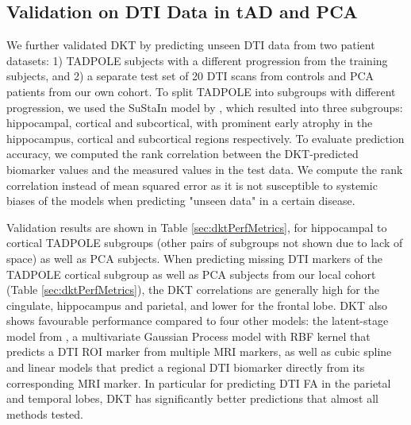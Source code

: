 \documentclass{llncs}
\begin{document}
\subsection{Validation on DTI Data in tAD and PCA}
\label{sec:dktResVal}

We further validated DKT by predicting unseen DTI data from two patient datasets: 1) TADPOLE subjects with a different progression from the training subjects, and 2) a separate test set of 20 DTI scans from controls and PCA patients from our own cohort. To split TADPOLE into subgroups with different progression, we used the SuStaIn model by \cite{young2018uncovering}, which resulted into three subgroups: hippocampal, cortical and subcortical, with prominent early atrophy in the hippocampus, cortical and subcortical regions respectively. To evaluate prediction accuracy, we computed the rank correlation between the DKT-predicted biomarker values and the measured values in the test data. We compute the rank correlation instead of mean squared error as it is not susceptible to systemic biases of the models when predicting "unseen data" in a certain disease.


Validation results are shown in Table \ref{sec:dktPerfMetrics}, for hippocampal to cortical TADPOLE subgroups (other pairs of subgroups not shown due to lack of space) as well as PCA subjects. When predicting missing DTI markers of the TADPOLE cortical subgroup as well as PCA subjects from our local cohort (Table \ref{sec:dktPerfMetrics}), the DKT correlations are generally high for the cingulate, hippocampus and parietal, and lower for the frontal lobe. DKT also shows favourable performance compared to four other models: the latent-stage model from \cite{jedynak2012computational}, a multivariate Gaussian Process model with RBF kernel that predicts a DTI ROI marker from multiple MRI markers, as well as cubic spline and linear models that predict a regional DTI biomarker directly from its corresponding MRI marker. In particular for predicting DTI FA in the parietal and temporal lobes, DKT has significantly better predictions that almost all methods tested.
\end{document}
